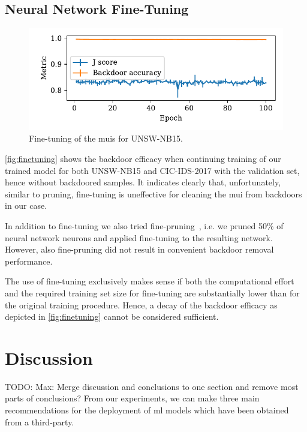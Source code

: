 \documentclass[10pt,sigconf,letterpaper,dvipsnames]{acmart}
\newcommand\note[2]{{\color{#1}#2}}
\newcommand\todo[1]{{\note{red}{TODO: #1}}}
\newcommand{\unsw}{UNSW-NB15}
\newcommand{\cic}{CIC-IDS-2017}
\begin{document}
\subsection{Neural Network Fine-Tuning}
\begin{figure}[t]
\includegraphics[width=\columnwidth]{figures/finetuning_2015.pdf}
\caption{Fine-tuning of the \glspl{mui} for \unsw{}.}
\label{fig:finetuning}
\end{figure}
\autoref{fig:finetuning} shows the backdoor efficacy when continuing training of our trained model for both \unsw{} and \cic{} with the validation set, hence without backdoored samples.
It indicates clearly that, unfortunately, similar to pruning, fine-tuning is uneffective for cleaning the \gls{mui} from backdoors in our case.

In addition to fine-tuning we also tried fine-pruning~\cite{liu_fine-pruning:_2018}, i.e. we pruned 50\% of neural network neurons and applied fine-tuning to the resulting network. However, also fine-pruning did not result in convenient backdoor removal performance.

The use of fine-tuning exclusively makes  sense if both the computational effort and the required training set size for fine-tuning are substantially lower than for the original training procedure. Hence, a decay of the backdoor efficacy as depicted in \autoref{fig:finetuning} cannot be considered sufficient.

\section{Discussion}
\todo{Max: Merge discussion and conclusions to one section and remove most parts of conclusions?}
From our experiments, we can make three main recommendations for the deployment of \gls{ml} models which have been obtained from a third-party.
\end{document}

